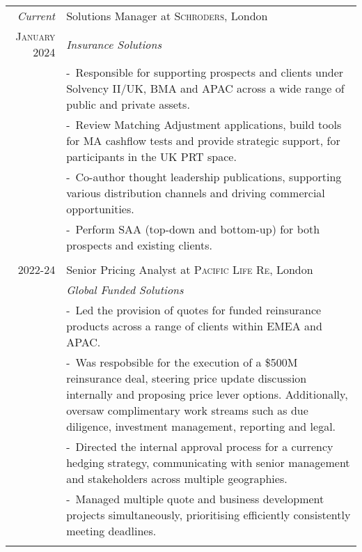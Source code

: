 \documentclass[a4paper,10pt]{article}
\newcommand{\blankline}{\multicolumn{1}{c}{}\\}
\newcommand{\projectitem}{\footnotesize-~\ignorespaces}
\begin{document}
\begin{tabularx}{\textwidth}{@{}r|>{\raggedright\arraybackslash}X@{}}
  \emph{Current} &Solutions Manager at \textsc{Schroders}, London \\
 \textsc{January 2024} & \emph{Insurance Solutions}\\
& \projectitem Responsible for supporting prospects and clients under Solvency II/UK, BMA and APAC across a wide range of public and private assets.\\
 & \projectitem Review Matching Adjustment applications, build tools for MA cashflow tests and provide strategic support, for participants in the UK PRT space.\\
  & \projectitem Co-author thought leadership publications, supporting various distribution channels and driving commercial opportunities. \\
  & \projectitem Perform SAA (top-down and bottom-up) for both prospects and existing clients.\\
  \blankline

\textsc{2022-24} & Senior Pricing Analyst at \textsc{Pacific Life Re}, London \\
 & \emph{Global Funded Solutions}\\
 & \projectitem Led the provision of quotes for funded reinsurance products across a range of clients within EMEA and APAC. \\
  & \projectitem Was respobsible for the execution of a \$500M reinsurance deal, steering price update discussion internally and proposing price lever options. Additionally, oversaw complimentary work streams such as due diligence, investment management, reporting and legal.\\
  & \projectitem Directed the internal approval process for a currency hedging strategy, communicating with senior management and stakeholders across multiple geographies. \\
  & \projectitem Managed multiple quote and business development projects simultaneously, prioritising efficiently consistently meeting deadlines.\\
  \blankline


\end{tabularx}
\end{document}
